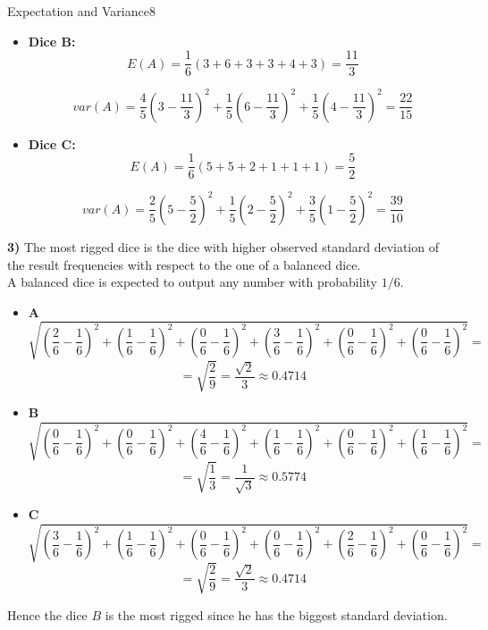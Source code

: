 \begin{questions}
\begin{question}{Expectation and Variance}{8}
\begin{answer}
\begin{itemize}
	$$
	var(A) = \frac{3}{5}(4-\frac{16}{6})^2 + \frac{1}{5}(2-\frac{16}{6})^2 + \frac{2}{5}(1-\frac{16}{6})^2 = \frac{34}{15}
	$$
	
	\item \textbf{Dice B: } \newline
	$$
	E(A) = \frac{1}{6} (3+6+3+3+4+3) = \frac{11}{3}
	$$
	
	$$
	var(A) = \frac{4}{5}(3-\frac{11}{3})^2 + 
	\frac{1}{5}(6-\frac{11}{3})^2 + 
	\frac{1}{5}(4-\frac{11}{3})^2 = \frac{22}{15}
	$$
	
	\item \textbf{Dice C: } \newline
	$$
	E(A) = \frac{1}{6} (5+5+2+1+1+1) = \frac{5}{2}
	$$
	
	$$
	var(A) = \frac{2}{5}(5-\frac{5}{2})^2 + 
	\frac{1}{5}(2-\frac{5}{2})^2 + 
	\frac{3}{5}(1-\frac{5}{2})^2 = \frac{39}{10}
	$$
\end{itemize}

\textbf{3)}
The most rigged dice is the dice with higher observed standard deviation of the result frequencies with respect to the one of a balanced dice.\\
A balanced dice is expected to output any number with probability $1/6$.
\begin{itemize}
	\item \textbf{A} 
	$$
	\sqrt{
		(\frac{2}{6}-\frac{1}{6})^2 +
		(\frac{1}{6}-\frac{1}{6})^2 +
		(\frac{0}{6}-\frac{1}{6})^2 +
		(\frac{3}{6}-\frac{1}{6})^2 +
		(\frac{0}{6}-\frac{1}{6})^2 +
		(\frac{0}{6}-\frac{1}{6})^2
	} = 
	$$
	$$
	= \sqrt{\frac{2}{9}} = \frac{\sqrt{2}}{3} \approx 0.4714
	$$
	\item \textbf{B} 
	$$
	\sqrt{
		(\frac{0}{6}-\frac{1}{6})^2 +
		(\frac{0}{6}-\frac{1}{6})^2 +
		(\frac{4}{6}-\frac{1}{6})^2 +
		(\frac{1}{6}-\frac{1}{6})^2 +
		(\frac{0}{6}-\frac{1}{6})^2 +
		(\frac{1}{6}-\frac{1}{6})^2
	} = 
	$$
	$$
	= \sqrt{\frac{1}{3}} = \frac{1}{\sqrt{3}} \approx 0.5774
	$$
	
	
	\item \textbf{C} 
	$$
	\sqrt{
		(\frac{3}{6}-\frac{1}{6})^2 +
		(\frac{1}{6}-\frac{1}{6})^2 +
		(\frac{0}{6}-\frac{1}{6})^2 +
		(\frac{0}{6}-\frac{1}{6})^2 +
		(\frac{2}{6}-\frac{1}{6})^2 +
		(\frac{0}{6}-\frac{1}{6})^2
	} = 
	$$
	$$
	= \sqrt{\frac{2}{9}} = \frac{\sqrt{2}}{3} \approx 0.4714
	$$
\end{itemize}

Hence the dice $B$ is the most rigged since he has the biggest standard deviation.
\end{answer}


\end{question}
\end{questions}

